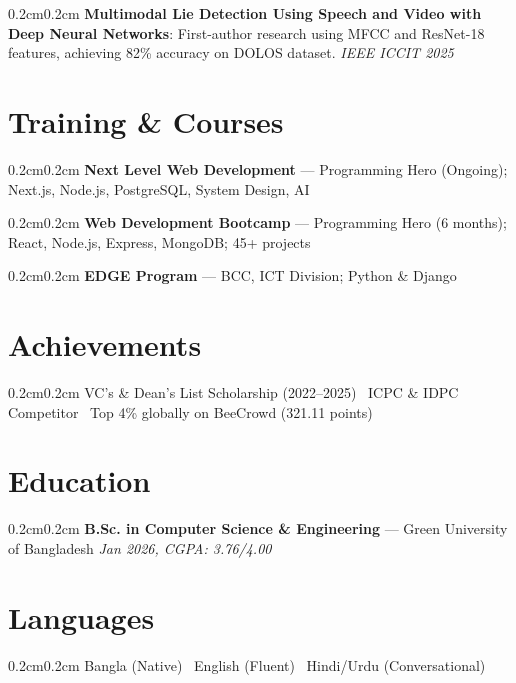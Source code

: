 \documentclass[10pt, a4paper]{article}
\newenvironment{onecolentry}{\begin{adjustwidth}{0.2cm}{0.2cm}}{\end{adjustwidth}}
\begin{document}
\begin{onecolentry}
\textbf{Multimodal Lie Detection Using Speech and Video with Deep Neural Networks}: First-author research using MFCC and ResNet-18 features, achieving 82\% accuracy on DOLOS dataset. \hfill \textit{IEEE ICCIT 2025}
\end{onecolentry}

\section{Training \& Courses}

\begin{onecolentry}
\textbf{Next Level Web Development} --- Programming Hero (Ongoing); Next.js, Node.js, PostgreSQL, System Design, AI
\end{onecolentry}

\begin{onecolentry}
\textbf{Web Development Bootcamp} --- Programming Hero (6 months); React, Node.js, Express, MongoDB; 45+ projects
\end{onecolentry}

\begin{onecolentry}
\textbf{EDGE Program} --- BCC, ICT Division; Python \& Django
\end{onecolentry}

\section{Achievements}

\begin{onecolentry}
VC's \& Dean's List Scholarship (2022--2025) \textbar\ ICPC \& IDPC Competitor \textbar\ Top 4\% globally on BeeCrowd (321.11 points)
\end{onecolentry}

\section{Education}

\begin{onecolentry}
\textbf{B.Sc. in Computer Science \& Engineering} --- Green University of Bangladesh \hfill \textit{Jan 2026, CGPA: 3.76/4.00}
\end{onecolentry}

\section{Languages}

\begin{onecolentry}
Bangla (Native) \textbar\ English (Fluent) \textbar\ Hindi/Urdu (Conversational)
\end{onecolentry}
\end{document}
